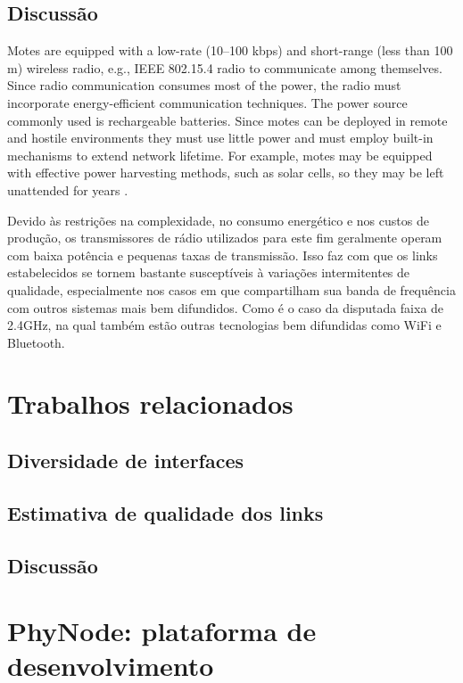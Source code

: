\documentclass[
	12pt,				%
	openright,			%
	oneside,
	a4paper,			%
	english,			%
	french,				%
	spanish,			%
	brazil				%
	]{abntex2}
\begin{document}
\section{Discussão}
Motes are equipped with a low-rate (10–100 kbps) and short-range (less than 100 m) wireless radio, e.g., IEEE 802.15.4 radio to communicate among themselves. 
Since radio communication consumes most of the power, the radio must incorporate energy-efficient communication techniques.
The power source commonly used is rechargeable batteries.
Since motes can be deployed in remote and hostile environments they must use little power and must employ built-in mechanisms to extend network lifetime.
For example, motes may be equipped with effective power harvesting methods, such as solar cells, so they may be left unattended for years \cite{Rawat2014}.

Devido às restrições na complexidade, no consumo energético e nos custos de produção, os transmissores de rádio utilizados para este fim geralmente operam com baixa potência e pequenas taxas de transmissão. Isso faz com que os links estabelecidos se tornem bastante susceptíveis à variações intermitentes de qualidade, especialmente nos casos em que compartilham sua banda de frequência com outros sistemas mais bem difundidos. Como é o caso da disputada faixa de 2.4GHz, na qual também estão outras tecnologias bem difundidas como WiFi e Bluetooth.


\chapter{Trabalhos relacionados}
	\section{Diversidade de interfaces}
	\section{Estimativa de qualidade dos links}
	\section{Discussão}

\chapter{PhyNode: plataforma de desenvolvimento} \label{phynode}
\end{document}
